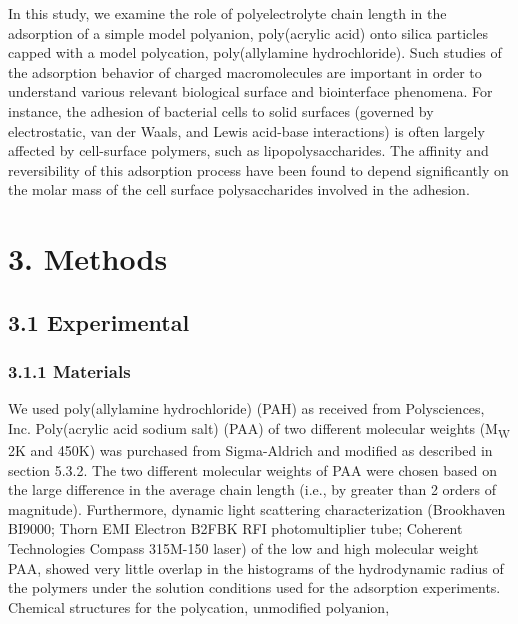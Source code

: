\documentclass[journal=mamobx,manuscript=article]{achemso}
\begin{document}
In this study, we examine the role of polyelectrolyte chain length in the adsorption of a simple model polyanion, poly(acrylic acid) onto silica particles capped with a model polycation, poly(allylamine hydrochloride).  Such studies of the adsorption behavior of charged macromolecules are important in order to understand various relevant biological surface and biointerface phenomena.  For instance, the adhesion of bacterial cells to solid surfaces (governed by electrostatic, van der Waals, and Lewis acid-base interactions) is often largely affected by cell-surface polymers, such as lipopolysaccharides.\cite{Jucker1997}  The affinity and reversibility of this adsorption process have been found to depend significantly on the molar mass of the cell surface polysaccharides involved in the adhesion.\cite{Jucker1997} 

\section{3. Methods}

\subsection{3.1 Experimental}

\subsubsection{3.1.1 Materials}

We used poly(allylamine hydrochloride) (PAH) as received from Polysciences, Inc. Poly(acrylic acid sodium salt) (PAA) of two different molecular weights (M\textsubscript{W} 2K and 450K) was purchased from Sigma-Aldrich and modified as described in section 5.3.2.  The two different molecular weights of PAA were chosen based on the large difference in the average chain length (i.e., by greater than 2 orders of magnitude).  Furthermore, dynamic light scattering characterization (Brookhaven BI9000; Thorn EMI Electron B2FBK RFI photomultiplier tube; Coherent Technologies Compass 315M-150 laser) of the low and high molecular weight PAA, showed very little overlap in the histograms of the hydrodynamic radius of the polymers under the solution conditions used for the adsorption experiments.  Chemical structures for the polycation, unmodified polyanion, 
\end{document}
